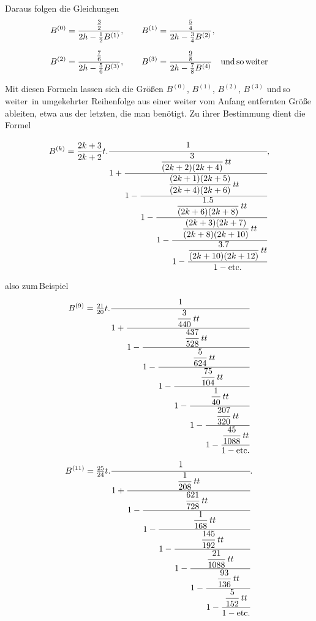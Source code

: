 %
\noindent Daraus folgen die Gleichungen
\[
\begin{aligned}
B^{(0)}&=\frac{\frac{3}{2}}{2h-\frac{1}{2}B^{(1)}},\qquad
B^{(1)}=\frac{\frac{5}{4}}{2h-\frac{3}{4}B^{(2)}},\\[6pt]
B^{(2)}&=\frac{\frac{7}{6}}{2h-\frac{5}{6}B^{(3)}},\qquad
B^{(3)}=\frac{\frac{9}{8}}{2h-\frac{7}{8}B^{(4)}}\quad\text{und\,so\,weiter}
\end{aligned}
\]

Mit diesen Formeln lassen sich die Größen $B^{(0)}$, $B^{(1)}$,
$B^{(2)}$, $B^{(3)}$ und\,so\,weiter\ in umgekehrter Reihenfolge aus einer weiter vom
Anfang entfernten Größe ableiten, etwa aus der letzten, die man benötigt. Zu ihrer Bestimmung
dient die Formel

\[
B^{(k)}=\frac{2k+3}{2k+2}t\mathord{.}\cfrac{1}{1+\cfrac{\dfrac{3}{(2k+2)(2k+4)}\,tt}{1-\cfrac{\dfrac{(2k+1)(2k+5)}{(2k+4)(2k+6)}\,tt}{1-\cfrac{\dfrac{1.5}{(2k+6)(2k+8)}\,tt}{1-\cfrac{\dfrac{(2k+3)(2k+7)}{(2k+8)(2k+10)}\,tt}{1-\cfrac{\dfrac{3.7}{(2k+10)(2k+12)}\,tt}{1-\text{etc.}}}}}}},
\]

\noindent also zum\,Beispiel
\[
B^{(9)}=\tfrac{21}{20}t\mathord{.}\cfrac{1}{1+\cfrac{\dfrac{3}{440}\,tt}{1-\cfrac{\dfrac{437}{528}\,tt}{1-\cfrac{\dfrac{5}{624}\,tt}{1-\cfrac{\dfrac{75}{104}\,tt}{1-\cfrac{\dfrac{1}{40}\,tt}{1-\cfrac{\dfrac{207}{320}\,tt}{1-\cfrac{\dfrac{45}{1088}\,tt}{1-\text{etc.}}}}}}}}}
\]
\[
B^{(11)}=\tfrac{25}{24}t\mathord{.}\cfrac{1}{1+\cfrac{\dfrac{1}{208}\,tt}{1-\cfrac{\dfrac{621}{728}\,tt}{1-\cfrac{\dfrac{1}{168}\,tt}{1-\cfrac{\dfrac{145}{192}\,tt}{1-\cfrac{\dfrac{21}{1088}\,tt}{1-\cfrac{\dfrac{93}{136}\,tt}{1-\cfrac{\dfrac{5}{152}\,tt}{1-\text{etc.}}}}}}}}}.
\]
